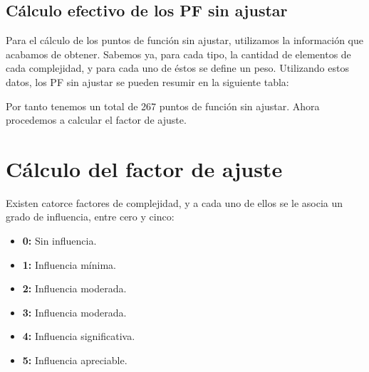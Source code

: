\documentclass[spanish,a4paper,11pt, twoside]{report}	%
\begin{document}
	\subsection{Cálculo efectivo de los PF sin ajustar}
	Para el cálculo de los puntos de función sin ajustar, utilizamos la información que acabamos de obtener. Sabemos ya, para cada tipo, la cantidad de elementos de cada complejidad, y para cada uno de éstos se define un peso. Utilizando estos datos, los PF sin ajustar se pueden resumir en la siguiente tabla: 

\vspace{0.35cm}
\vspace{0.35cm}

	Por tanto tenemos un total de 267 puntos de función sin ajustar. Ahora procedemos a calcular el factor de ajuste.

\section{Cálculo del factor de ajuste}
	Existen catorce factores de complejidad, y a cada uno de ellos se le asocia un grado de influencia, entre cero y cinco:
	\begin{itemize}
	\item{\textbf{0:}} Sin influencia. 
	\item{\textbf{1:}} Influencia mínima.
	\item{\textbf{2:}} Influencia moderada.
	\item{\textbf{3:}} Influencia moderada.
	\item{\textbf{4:}} Influencia significativa.
	\item{\textbf{5:}} Influencia apreciable.
	\end{itemize}
	
\end{document}
